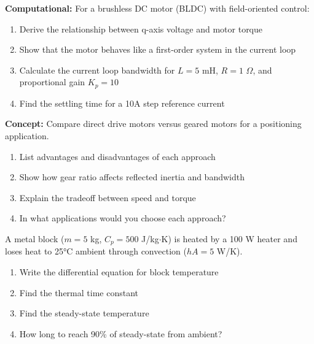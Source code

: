 \begin{exercise}
\textbf{Computational:} For a brushless DC motor (BLDC) with field-oriented control:

\begin{enumerate}[label=(\alph*)]
    \item Derive the relationship between q-axis voltage and motor torque
    \item Show that the motor behaves like a first-order system in the current loop
    \item Calculate the current loop bandwidth for $L = 5$ mH, $R = 1$ $\Omega$, and proportional gain $K_p = 10$
    \item Find the settling time for a 10A step reference current
\end{enumerate}
\end{exercise}

\begin{exercise}
\textbf{Concept:} Compare direct drive motors versus geared motors for a positioning application.

\begin{enumerate}[label=(\alph*)]
    \item List advantages and disadvantages of each approach
    \item Show how gear ratio affects reflected inertia and bandwidth
    \item Explain the tradeoff between speed and torque
    \item In what applications would you choose each approach?
\end{enumerate}
\end{exercise}


\begin{exercise}
A metal block ($m = 5$ kg, $C_p = 500$ J/kg$\cdot$K) is heated by a 100 W heater and loses heat to 25°C ambient through convection ($hA = 5$ W/K).
\begin{enumerate}[label=(\alph*)]
    \item Write the differential equation for block temperature
    \item Find the thermal time constant
    \item Find the steady-state temperature
    \item How long to reach 90\% of steady-state from ambient?
\end{enumerate}
\end{exercise}

